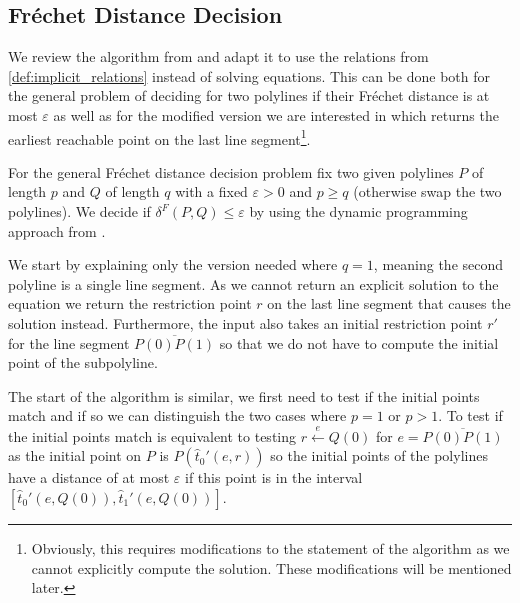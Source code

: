 \subsection{Fréchet Distance Decision}
We review the algorithm from \citeauthor{computing_the_frechet_distance_between_two_polygonal_curves} and adapt it to use the relations from \cref{def:implicit_relations} instead of solving equations. This can be done both for the general problem of deciding for two polylines if their Fréchet distance is at most \(\varepsilon\) as well as for the modified version we are interested in which returns the earliest reachable point on the last line segment\footnote{Obviously, this requires modifications to the statement of the algorithm as we cannot explicitly compute the solution. These modifications will be mentioned later.}. 

For the general Fréchet distance decision problem fix two given polylines \(P\) of length \(p\) and \(Q\) of length \(q\) with a fixed \(\varepsilon > 0\) and \(p \geq q\) (otherwise swap the two polylines). We decide if \(\delta^F(P, Q) \leq \varepsilon\) by using the dynamic programming approach from \citeauthor{computing_the_frechet_distance_between_two_polygonal_curves}. 

We start by explaining only the version needed where \(q = 1\), meaning the second polyline is a single line segment. As we cannot return an explicit solution to the equation we return the restriction point \(r\) on the last line segment that causes the solution instead. Furthermore, the input also takes an initial restriction point \(r'\) for the line segment \(\overline{P(0)P(1)}\) so that we do not have to compute the initial point of the subpolyline. 

The start of the algorithm is similar, we first need to test if the initial points match and if so we can distinguish the two cases where \(p = 1\) or \(p > 1\). To test if the initial points match is equivalent to testing \(r \overset e\leftarrow Q(0)\) for \(e = \overline{P(0)P(1)}\) as the initial point on \(P\) is \(P(\hat t_0'(e, r))\) so the initial points of the polylines have a distance of at most \(\varepsilon\) if this point is in the interval \([\hat t_0'(e, Q(0)), \hat t_1'(e, Q(0))]\).

